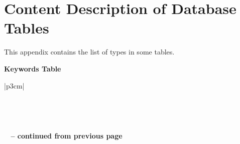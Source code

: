 %
%
%                 

\chapter{Content Description of Database Tables}
\label{sec:appendixm}

This appendix contains the list of types in some tables.

\textbf{Keywords Table}
\begin{longtable}{|p{3cm}|}
\caption{Keywords List} \vspace{0.25em} \\ \hline 

\hline {}  \\ \hline 
\endfirsthead

{{\bfseries \tablename\ \thetable{} -- continued from previous page}} \\
\hline {} \\ \hline 
\endhead

\hline {} \\ \hline
\endfoot


\end{longtable}
